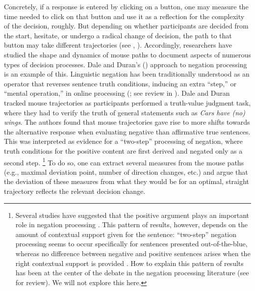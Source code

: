 \documentclass[11pt]{article}
\begin{document}
Concretely, if a response is entered by clicking on a button, one may measure the time needed to click on that button and use it as a reflection for the complexity of the decision, roughly. But depending on whether participants are decided from the start, hesitate, or undergo a radical change of decision, the path to that button may take different trajectories (see , \citealp{Wojnowicz2009}). %
Accordingly, researchers have studied the shape and dynamics of mouse paths to document aspects of numerous types of decision processes. Dale and Duran's (\citeyear{Dale2011}) approach to negation processing is an example of this.   
Linguistic negation has been traditionally understood as an operator that reverses sentence truth conditions, inducing an extra ``step,'' or ``mental operation,'' in online processing (\citealp{wason1965contexts,wason1972psychology}; see review in \citealp{Tian2016}). %
Dale and Duran tracked mouse trajectories as participants performed a truth-value judgment task, where they had to verify the truth of general statements such as \textit{Cars have (no) wings}.
%
The authors found that mouse trajectories gave rise to more shifts towards the alternative response when evaluating negative than affirmative true sentences. This was interpreted as evidence for a ``two-step'' processing of negation, where truth conditions for the positive content are first derived and negated only as a second step.%
%
\footnote{Several studies have suggested that the positive argument plays an important role in negation processing \citep[among others]{kaup2007experiential,ludtke2008event}.  
This pattern of results, however, depends on the amount of contextual support given for the sentence: ``two-step'' negation processing seems to occur specifically for sentences presented out-of-the-blue, whereas no difference between negative and positive sentences arises when the right contextual support is provided \citep{nieuwland2008truth,tian2010we}. How to explain this pattern of results has been at the center of the debate in the negation processing literature (see \citealp{Tian2016} for review). We will not explore this here.}
To do so, one can extract several measures from the mouse paths (e.g., maximal deviation point, number of direction changes, etc.) and argue that the deviation of these measures from what they would be for an optimal, straight trajectory reflects the relevant decision change.

\end{document}
